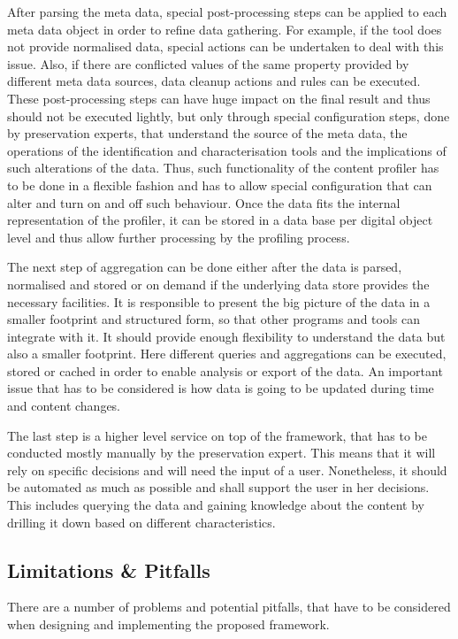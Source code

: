 After parsing the meta data, special post-processing steps can be applied to each meta data object in order to refine data gathering. For example, if the tool does not provide normalised data, special actions can be undertaken to deal with this issue. Also, if there are conflicted values of the same property provided by different meta data sources, data cleanup actions and rules can be executed. These post-processing steps can have huge impact on the final result and thus should not be executed lightly, but only through special configuration steps, done by preservation experts, that understand the source of the meta data, the operations of the identification and characterisation tools and the implications of such alterations of the data. Thus, such functionality of the content profiler has to be done in a flexible fashion and has to allow special configuration that can alter and turn on and off such behaviour. Once the data fits the internal representation of the profiler, it can be stored in a data base per digital object level and thus allow further processing by the profiling process.

The next step of aggregation can be done either after the data is parsed, normalised and stored or on demand if the underlying data store provides the necessary facilities. It is responsible to present the big picture of the data in a smaller footprint and structured form, so that other programs and tools can integrate with it. It should provide enough flexibility to understand the data but also a smaller footprint. Here different queries and aggregations can be executed, stored or cached in order to enable analysis or export of the data. An important issue that has to be considered is how data is going to be updated during time and content changes. 

The last step is a higher level service on top of the framework, that has to be conducted mostly manually by the preservation expert. This means that it will rely on specific decisions and will need the input of a user. Nonetheless, it should be automated as much as possible and shall support the user in her decisions. This includes querying the data and gaining knowledge about the content by drilling it down based on different characteristics.

\subsection{Limitations \& Pitfalls}
There are a number of problems and potential pitfalls, that have to be considered when designing and implementing the proposed framework.

